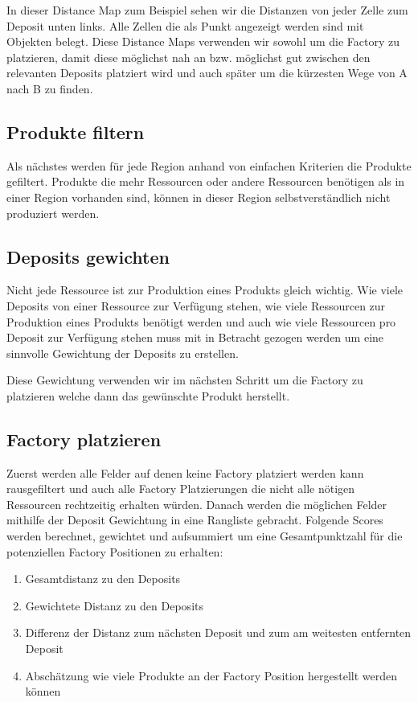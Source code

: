 \documentclass[12pt,a4paper]{article}
\begin{document}
In dieser Distance Map zum Beispiel sehen wir die Distanzen von jeder Zelle zum Deposit unten links. Alle Zellen die als Punkt angezeigt werden sind mit Objekten belegt. Diese Distance Maps verwenden wir sowohl um die Factory zu platzieren, damit diese möglichst nah an bzw. möglichst gut zwischen den relevanten Deposits platziert wird und auch später um die kürzesten Wege von A nach B zu finden.

\subsection{Produkte filtern}
Als nächstes werden für jede Region anhand von einfachen Kriterien die Produkte gefiltert. Produkte die mehr Ressourcen oder andere Ressourcen benötigen als in einer Region vorhanden sind, können in dieser Region selbstverständlich nicht produziert werden.

\subsection{Deposits gewichten}
Nicht jede Ressource ist zur Produktion eines Produkts gleich wichtig. Wie viele Deposits  von einer Ressource zur Verfügung stehen, wie viele Ressourcen zur Produktion eines Produkts benötigt werden und auch wie viele Ressourcen pro Deposit zur Verfügung stehen muss mit in Betracht gezogen werden um eine sinnvolle Gewichtung der Deposits zu erstellen.


Diese Gewichtung verwenden wir im nächsten Schritt um die Factory zu platzieren welche dann das gewünschte Produkt herstellt.

\subsection{Factory platzieren}
Zuerst werden alle Felder auf denen keine Factory platziert werden kann rausgefiltert  und auch alle Factory Platzierungen die nicht alle nötigen Ressourcen rechtzeitig erhalten würden. Danach werden die möglichen Felder mithilfe der Deposit Gewichtung in eine Rangliste gebracht.
Folgende Scores werden berechnet, gewichtet und aufsummiert um eine Gesamtpunktzahl für die potenziellen Factory Positionen zu erhalten:

\begin{enumerate}
    \item Gesamtdistanz zu den Deposits
    \item Gewichtete Distanz zu den Deposits
    \item Differenz der Distanz zum nächsten Deposit und zum am weitesten entfernten Deposit
    \item Abschätzung wie viele Produkte an der Factory Position hergestellt werden können 
\end{enumerate}
\end{document}
